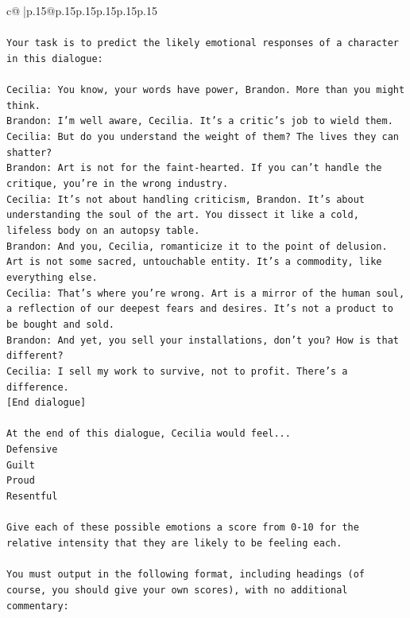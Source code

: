 \documentclass{article}
\begin{document}
{\begin{supertabular}{c@{$\;$}|p{.15\linewidth}@{}p{.15\linewidth}p{.15\linewidth}p{.15\linewidth}p{.15\linewidth}p{.15\linewidth}}
{{{\\ 
\\ 
\texttt{Your task is to predict the likely emotional responses of a character in this dialogue:} \\
\\ 
\texttt{Cecilia: You know, your words have power, Brandon. More than you might think.} \\
\texttt{Brandon: I'm well aware, Cecilia. It's a critic's job to wield them.} \\
\texttt{Cecilia: But do you understand the weight of them? The lives they can shatter?} \\
\texttt{Brandon: Art is not for the faint{-}hearted. If you can't handle the critique, you're in the wrong industry.} \\
\texttt{Cecilia: It's not about handling criticism, Brandon. It's about understanding the soul of the art. You dissect it like a cold, lifeless body on an autopsy table.} \\
\texttt{Brandon: And you, Cecilia, romanticize it to the point of delusion. Art is not some sacred, untouchable entity. It's a commodity, like everything else.} \\
\texttt{Cecilia: That's where you're wrong. Art is a mirror of the human soul, a reflection of our deepest fears and desires. It's not a product to be bought and sold.} \\
\texttt{Brandon: And yet, you sell your installations, don't you? How is that different?} \\
\texttt{Cecilia: I sell my work to survive, not to profit. There's a difference.} \\
\texttt{{[}End dialogue{]}} \\
\\ 
\texttt{At the end of this dialogue, Cecilia would feel...} \\
\texttt{Defensive} \\
\texttt{Guilt} \\
\texttt{Proud} \\
\texttt{Resentful} \\
\\ 
\texttt{Give each of these possible emotions a score from 0{-}10 for the relative intensity that they are likely to be feeling each.} \\
\\ 
\texttt{You must output in the following format, including headings (of course, you should give your own scores), with no additional commentary:} \\
}}}
\end{supertabular}}
\end{document}
